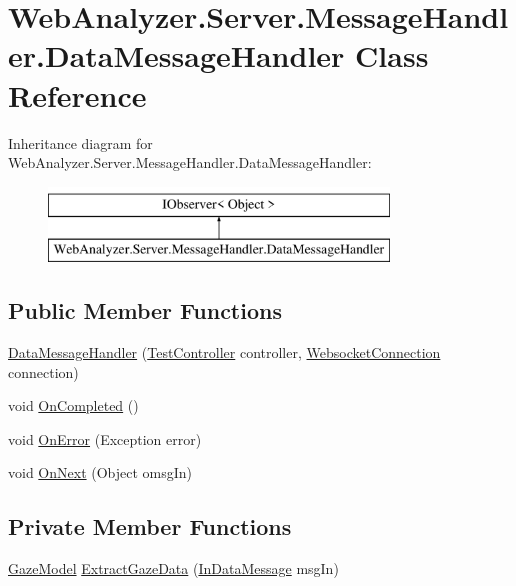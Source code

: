 \hypertarget{class_web_analyzer_1_1_server_1_1_message_handler_1_1_data_message_handler}{}\section{Web\+Analyzer.\+Server.\+Message\+Handler.\+Data\+Message\+Handler Class Reference}
\label{class_web_analyzer_1_1_server_1_1_message_handler_1_1_data_message_handler}
Inheritance diagram for Web\+Analyzer.\+Server.\+Message\+Handler.\+Data\+Message\+Handler\+:\begin{figure}[H]
\begin{center}
\leavevmode
\includegraphics[height=2.000000cm]{class_web_analyzer_1_1_server_1_1_message_handler_1_1_data_message_handler}
\end{center}
\end{figure}
\subsection*{Public Member Functions}
\begin{DoxyCompactItemize}
\item 
\hyperlink{class_web_analyzer_1_1_server_1_1_message_handler_1_1_data_message_handler_a5fe3823e540e3dbecaf9899d81ce8074}{Data\+Message\+Handler} (\hyperlink{class_web_analyzer_1_1_controller_1_1_test_controller}{Test\+Controller} controller, \hyperlink{class_web_analyzer_1_1_server_1_1_websocket_connection}{Websocket\+Connection} connection)
\item 
void \hyperlink{class_web_analyzer_1_1_server_1_1_message_handler_1_1_data_message_handler_a6604e45715842b5c95ec421de45cf2cc}{On\+Completed} ()
\item 
void \hyperlink{class_web_analyzer_1_1_server_1_1_message_handler_1_1_data_message_handler_aa93b7e36208ccfd2253985652accc2c9}{On\+Error} (Exception error)
\item 
void \hyperlink{class_web_analyzer_1_1_server_1_1_message_handler_1_1_data_message_handler_a30be217815bd3c9f1bd1550ec72be01d}{On\+Next} (Object omsg\+In)
\end{DoxyCompactItemize}
\subsection*{Private Member Functions}
\begin{DoxyCompactItemize}
\item 
\hyperlink{class_web_analyzer_1_1_models_1_1_data_model_1_1_gaze_model}{Gaze\+Model} \hyperlink{class_web_analyzer_1_1_server_1_1_message_handler_1_1_data_message_handler_a374dcd61092a8d072dac4a806d4148ad}{Extract\+Gaze\+Data} (\hyperlink{class_web_analyzer_1_1_models_1_1_message_model_1_1_in_data_message}{In\+Data\+Message} msg\+In)
\end{DoxyCompactItemize}
